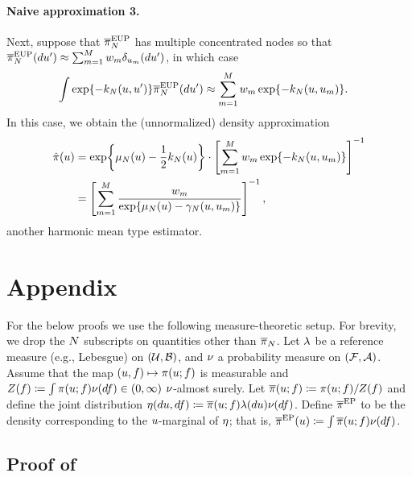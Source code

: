 \documentclass[12pt]{article}
\begin{document}
\paragraph{Naive approximation 3.}
Next, suppose that $\postApproxNormMarg$ has multiple concentrated nodes so that 
$\postApproxNormMarg(d\Par^\prime) \approx \sum_{m=1}^{M} w_m \delta_{\Par_m}(d\Par^\prime)$,
in which case
\begin{align}
\int \Exp{-\gpKer(\Par, \Par^\prime)} \postApproxNormMarg(d\Par^\prime)
&\approx \sum_{m=1}^{M} w_m \Exp{-\gpKer(\Par, \Par_m)}.
\end{align}
In this case, we obtain the (unnormalized) density approximation
\begin{align}
\hat{\pi}(\Par)
&= \Exp{\gpMean(\Par) - \frac{1}{2}\gpKer(\Par)} \cdot \left[\sum_{m=1}^{M} w_m \Exp{-\gpKer(\Par, \Par_m)}\right]^{-1} \\
&= \left[\sum_{m=1}^{M} \frac{w_m}{\Exp{\gpMean(\Par) - \gamma_N(\Par, \Par_m)}}  \right]^{-1},
\end{align}
another harmonic mean type estimator.

\section{Appendix}

For the below proofs we use the following measure-theoretic setup. For brevity, we drop the 
$\Ndesign$ subscripts on quantities other than $\postNormEm$.
Let $\refMeas$ be a reference measure (e.g., Lebesgue) on $(\parSpace, \BorelSig)$,
and $\emDist[]$ a probability measure on $(\emSpace, \emSig)$. Assume that 
the map $(\Par, \targetTraj) \mapsto \postDens(\Par; \targetTraj)$ is measurable
and $\normCst(\targetTraj) \Def \int \postDens(\Par; \targetTraj) \emDist[](d\targetTraj) \in (0,\infty)$
$\emDist[]$-almost surely. Let $\postDensNorm(\Par; \targetTraj) \Def \postDens(\Par; \targetTraj) / \normCst(\targetTraj)$
and define the joint distribution 
$\emJoint(d\Par, d\targetTraj) \Def \postDensNorm(\Par; \targetTraj) \refMeas(d\Par)\emDist[](d\targetTraj)$.
Define $\postApproxEP[]$ to be the density corresponding to the $\Par$-marginal of $\emJoint$; that is,
$\postApproxEP[](\Par) \Def \int \postDensNorm(\Par; \targetTraj) \emDist[](d\targetTraj)$. 

\subsection{Proof of }
\end{document}

